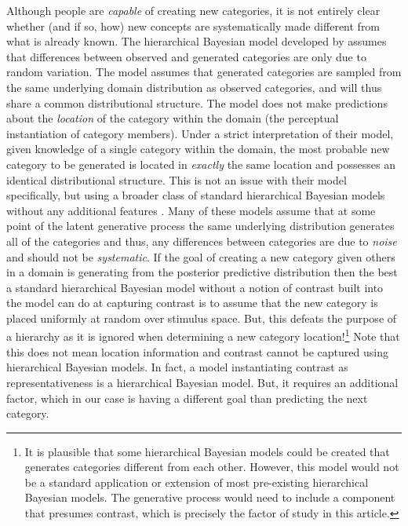 \documentclass[12pt]{article}
\begin{document}
\begin{flushleft}
Although people are {\em capable} of creating 
new categories, it is not entirely clear whether (and if so, how) new concepts are systematically
made different from what is already known. The hierarchical Bayesian model
developed by \cite{jern2013probabilistic} assumes that differences between
observed and generated categories are only due to random variation. The model
assumes that generated categories are sampled from the same underlying domain
distribution as observed categories, and will thus share a common distributional
structure. The model does not make predictions about the {\em location} of the
category within the domain (the perceptual instantiation of category members).
Under a strict interpretation of their model, given knowledge of a single
category within the domain, the most probable new category to be generated is
located in {\em exactly} the same location and possesses an identical
distributional structure. This is not an issue with their model specifically,
but using a broader class of standard hierarchical Bayesian models without any
additional features \citep[e.g., ][]{griffithsscn07,kemp07}. Many of these
models assume that at some point of the latent generative process the same
underlying distribution generates all of the categories and thus, any
differences between categories are due to {\em noise} and should not be {\em
  systematic}. If the goal of creating a new category given others in a domain
is generating from the posterior predictive distribution then the best a
standard hierarchical Bayesian model without a notion of contrast built into the
model can do at capturing contrast is to assume that the new category is placed
uniformly at random over stimulus space. But, this defeats the purpose of a
hierarchy as it is ignored when determining a new category location!\footnote{It
  is plausible that some hierarchical Bayesian models could be created that
  generates categories different from each other. However, this model would not
  be a standard application or extension of most pre-existing hierarchical
  Bayesian models. The generative process would need to include a component that
  presumes contrast, which is precisely the factor of study in this article.} Note that this does not mean location information and
contrast cannot be captured using hierarchical Bayesian models. In fact, a model
instantiating contrast as representativeness is a hierarchical Bayesian model.
But, it requires an additional factor, which in our case is having a different
goal than predicting the next category.


\end{flushleft}
\end{document}
